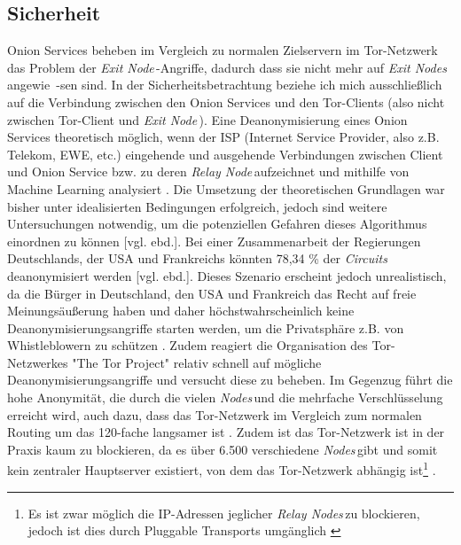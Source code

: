\documentclass[a4paper,ngerman, headheight=28pt,12pt]{scrartcl}
\newcommand{\vcite}[1]{\cite[vgl.][]{#1}}
\newcommand{\vebd}{[vgl. ebd.]}
\newcommand{\relayn}{\textit{Relay Node\,}}
\newcommand{\relayns}{\textit{Relay Nodes\,}}
\newcommand{\exitn}{\textit{Exit Node\,}}
\newcommand{\exitns}{\textit{Exit Nodes\,}}
\newcommand{\nodes}{\textit{Nodes\,}}
\newcommand{\circuits}{\textit{Circuits\,}}
\begin{document}
\subsection{Sicherheit}
Onion Services beheben im Vergleich zu normalen Zielservern im Tor-Netzwerk das Problem der \exitn-Angriffe, dadurch dass sie nicht mehr auf \exitns angewie~-sen sind.
In der Sicherheitsbetrachtung beziehe ich mich ausschließlich auf die Verbindung zwischen den Onion Services und den Tor-Clients (also nicht zwischen Tor-Client und \exitn). Eine Deanonymisierung eines Onion Services theoretisch möglich, wenn der ISP (Internet Service Provider, also z.B. Telekom, EWE, etc.) eingehende und ausgehende Verbindungen zwischen Client und Onion Service bzw. zu deren \relayn aufzeichnet und mithilfe von Machine Learning analysiert \vcite{OnionServiceFingerprinting}. Die Umsetzung der theoretischen Grundlagen war bisher unter idealisierten Bedingungen erfolgreich, jedoch sind weitere Untersuchungen notwendig, um die potenziellen Gefahren dieses Algorithmus einordnen zu können \vebd. Bei einer Zusammenarbeit der Regierungen Deutschlands, der USA und Frankreichs könnten 78,34 \% der \circuits deanonymisiert werden \vebd.
Dieses Szenario erscheint jedoch unrealistisch, da die Bürger in Deutschland, den USA und Frankreich das Recht auf freie Meinungsäußerung haben und daher höchstwahrscheinlich keine Deanonymisierungsangriffe starten werden, um die Privatsphäre z.B. von Whistleblowern zu schützen \vcite{AmnReport,ROG-USA}.
Zudem reagiert die Organisation des Tor-Netzwerkes "The Tor Project" relativ schnell auf mögliche Deanonymisierungsangriffe und versucht diese zu beheben.
Im Gegenzug führt die hohe Anonymität, die durch die vielen \nodes und die mehrfache Verschlüsselung erreicht wird, auch dazu, dass das Tor-Netzwerk im Vergleich zum normalen Routing um das 120-fache langsamer ist \vcite{TorPerformance}.
Zudem ist das Tor-Netzwerk ist in der Praxis kaum zu blockieren, da es über 6.500 verschiedene \nodes gibt und somit kein zentraler Hauptserver existiert, von dem das Tor-Netzwerk abhängig ist\footnote{Es ist zwar möglich die IP-Adressen jeglicher \relayns zu blockieren, jedoch ist dies durch Pluggable Transports umgänglich \vcite{PluggableTransports}} \vcite{DeanonymizingTorBook}.

\end{document}
